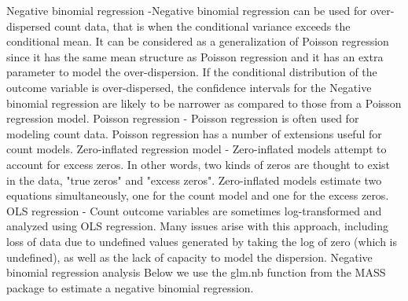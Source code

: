 \documentclass[00-GLMregression.tex]{subfiles}
\begin{document}
Negative binomial regression -Negative binomial regression can be used for over-dispersed count data, that is when the conditional variance exceeds the conditional mean. It can be considered as a generalization of Poisson regression since it has the same mean structure as Poisson regression and it has an extra parameter to model the over-dispersion. If the conditional distribution of the outcome variable is over-dispersed, the confidence intervals for the Negative binomial regression are likely to be narrower as compared to those from a Poisson regression model.
Poisson regression - Poisson regression is often used for modeling count data. Poisson regression has a number of extensions useful for count models.
Zero-inflated regression model - Zero-inflated models attempt to account for excess zeros. In other words, two kinds of zeros are thought to exist in the data, "true zeros" and "excess zeros". Zero-inflated models estimate two equations simultaneously, one for the count model and one for the excess zeros.
OLS regression - Count outcome variables are sometimes log-transformed and analyzed using OLS regression. Many issues arise with this approach, including loss of data due to undefined values generated by taking the log of zero (which is undefined), as well as the lack of capacity to model the dispersion.
Negative binomial regression analysis
Below we use the glm.nb function from the MASS package to estimate a negative binomial regression.
\end{document}
